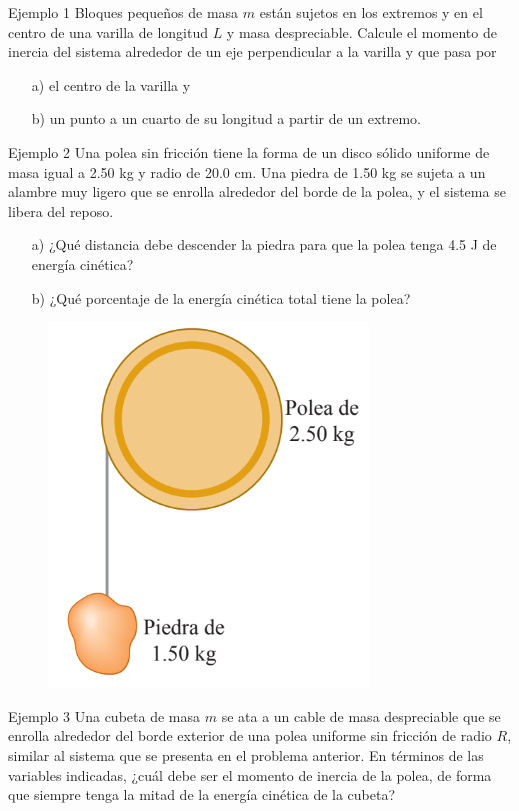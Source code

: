 \begin{frame}{Ejemplo 1}
    Bloques pequeños de masa $m$ están sujetos en los extremos y en el centro de una varilla de longitud $L$ y masa despreciable. Calcule el momento de inercia del sistema alrededor de un eje perpendicular a la varilla y que pasa por
    
    \begin{itemize}
        \item[a)] el centro de la varilla y
        \item[b)] un punto a un cuarto de su longitud a partir de un extremo.
    \end{itemize}
\end{frame}

\begin{frame}{Ejemplo 2}
    Una polea sin fricción tiene la forma de un disco sólido uniforme de masa igual a 2.50 kg y radio de 20.0 cm. Una piedra de 1.50 kg se sujeta a un alambre muy ligero que se enrolla alrededor del borde de la polea, y el sistema se libera del reposo.
    \begin{itemize}
        \item[a)] ¿Qué distancia debe descender la piedra para que la polea tenga 4.5 J de energía cinética?
        \item[b)] ¿Qué porcentaje de la energía cinética total tiene la polea?
    \end{itemize}

    \begin{figure}
        \centering
        \includegraphics[width=0.3\linewidth]{figures/polea-roca.png}
    \end{figure}
    
\end{frame}

\begin{frame}{Ejemplo 3}
    Una cubeta de masa $m$ se ata a un cable de masa despreciable que se enrolla alrededor del borde exterior de una polea uniforme sin fricción de radio $R$, similar al sistema que se presenta en el problema anterior. En términos de las variables indicadas, ¿cuál debe ser el momento de inercia de la polea, de forma que siempre tenga la mitad de la energía cinética de la cubeta?
\end{frame}
